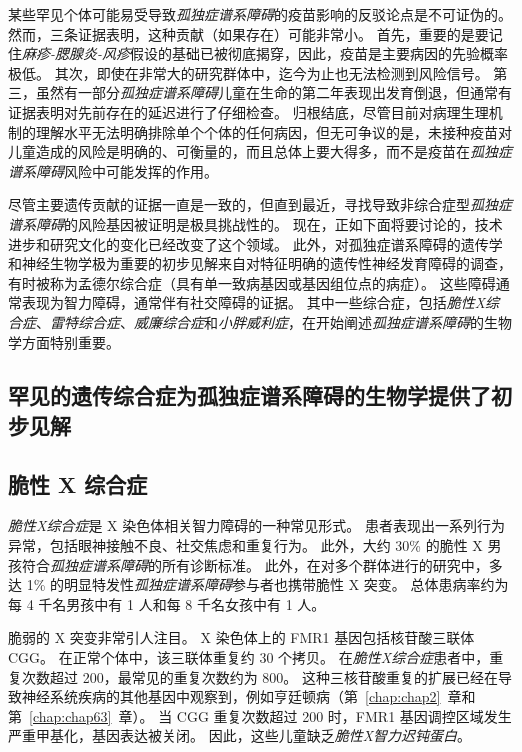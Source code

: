 某些罕见个体可能易受导致\textit{孤独症谱系障碍}的疫苗影响的反驳论点是不可证伪的。
然而，三条证据表明，这种贡献（如果存在）可能非常小。
首先，重要的是要记住\textit{麻疹-腮腺炎-风疹}假设的基础已被彻底揭穿，因此，疫苗是主要病因的先验概率极低。
其次，即使在非常大的研究群体中，迄今为止也无法检测到风险信号。
第三，虽然有一部分\textit{孤独症谱系障碍}儿童在生命的第二年表现出发育倒退，但通常有证据表明对先前存在的延迟进行了仔细检查。
归根结底，尽管目前对病理生理机制的理解水平无法明确排除单个个体的任何病因，但无可争议的是，未接种疫苗对儿童造成的风险是明确的、可衡量的，而且总体上要大得多，而不是疫苗在\textit{孤独症谱系障碍}风险中可能发挥的作用。


尽管主要遗传贡献的证据一直是一致的，但直到最近，寻找导致非综合症型\textit{孤独症谱系障碍}的风险基因被证明是极具挑战性的。
现在，正如下面将要讨论的，技术进步和研究文化的变化已经改变了这个领域。
此外，对孤独症谱系障碍的遗传学和神经生物学极为重要的初步见解来自对特征明确的遗传性神经发育障碍的调查，有时被称为孟德尔综合症（具有单一致病基因或基因组位点的病症）。
这些障碍通常表现为智力障碍，通常伴有社交障碍的证据。
其中一些综合症，包括\textit{脆性X综合症}、\textit{雷特综合症}、\textit{威廉综合症}和\textit{小胖威利症}，在开始阐述\textit{孤独症谱系障碍}的生物学方面特别重要。



\subsection{罕见的遗传综合症为孤独症谱系障碍的生物学提供了初步见解}

\subsection{脆性 X 综合症}

\textit{脆性X综合症}是 X 染色体相关智力障碍的一种常见形式。
患者表现出一系列行为异常，包括眼神接触不良、社交焦虑和重复行为。
此外，大约 30\% 的脆性 X 男孩符合\textit{孤独症谱系障碍}的所有诊断标准。
此外，在对多个群体进行的研究中，多达 1\% 的明显特发性\textit{孤独症谱系障碍}参与者也携带脆性 X 突变。
总体患病率约为每 4 千名男孩中有 1 人和每 8 千名女孩中有 1 人。


脆弱的 X 突变非常引人注目。
X 染色体上的 FMR1 基因包括核苷酸三联体 CGG。
在正常个体中，该三联体重复约 30 个拷贝。
在\textit{脆性X综合症}患者中，重复次数超过 200，最常见的重复次数约为 800。
这种三核苷酸重复的扩展已经在导致神经系统疾病的其他基因中观察到，例如亨廷顿病（第~\ref{chap:chap2}~章和第~\ref{chap:chap63}~章）。
当 CGG 重复次数超过 200 时，FMR1 基因调控区域发生严重甲基化，基因表达被关闭。
因此，这些儿童缺乏\textit{脆性X智力迟钝蛋白}。


